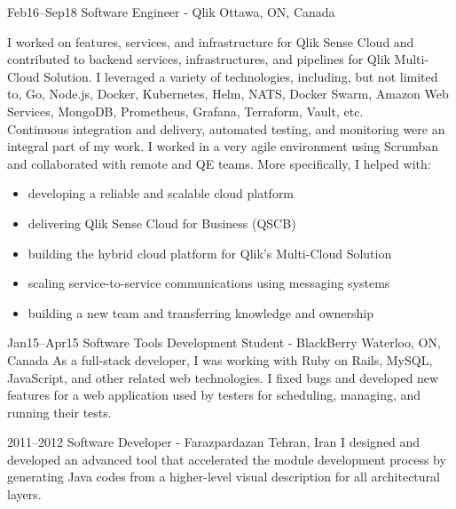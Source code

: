 \documentclass[]{cv-style}                     %
\begin{document}
\begin{entrylist}
  \entry
  {\small Feb16--Sep18}
  {Software Engineer - Qlik}
  {Ottawa, ON, Canada}
  {I worked on features, services, and infrastructure for Qlik Sense Cloud and
   contributed to backend services, infrastructures, and pipelines for Qlik Multi-Cloud Solution.
   I leveraged a variety of technologies, including, but not limited to, Go, Node.js, Docker, Kubernetes, Helm,
   NATS, Docker Swarm, Amazon Web Services, MongoDB, Prometheus, Grafana, Terraform, Vault, etc. \\
   Continuous integration and delivery, automated testing, and monitoring were an integral part of my work.
   I worked in a very agile environment using Scrumban and collaborated with remote and QE teams.
   More specifically, I helped with:
     \begin{itemize}
         \item developing a reliable and scalable cloud platform
         \item delivering Qlik Sense Cloud for Business (QSCB)
         \item building the hybrid cloud platform for Qlik's Multi-Cloud Solution
         \item scaling service-to-service communications using messaging systems
         \item building a new team and transferring knowledge and ownership
     \end{itemize}
   }

  \entry
  {\small Jan15--Apr15}
  {Software Tools Development Student - BlackBerry}
  {Waterloo, ON, Canada}
  {As a full-stack developer, I was working with Ruby on Rails, MySQL, JavaScript, and other related web technologies.
   I fixed bugs and developed new features for a web application used by testers for scheduling, managing, and running their tests.}

  \entry
  {\small 2011--2012}
  {Software Developer - Farazpardazan}
  {Tehran, Iran}
  {I designed and developed an advanced tool that accelerated the module development process by
   generating Java codes from a higher-level visual description for all architectural layers.}


\end{entrylist}
\end{document}
